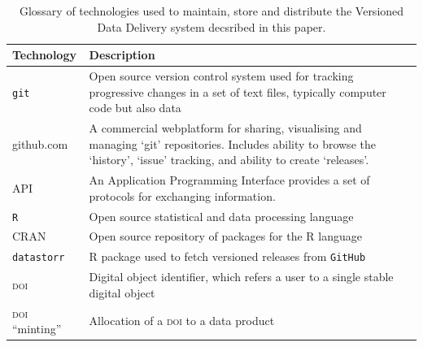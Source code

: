 \documentclass[a4paper,11pt]{article}
\begin{document}
\begin{table}[h!]
\centering
\caption{Glossary of technologies used to maintain, store and distribute the Versioned Data Delivery system decsribed in this paper.}
{\footnotesize
\vspace{1cm}
  \begin{tabular}{p{5cm}p{10cm}}
  \hline
  \textbf{Technology} & \textbf{Description} \\\hline
   \texttt{git} & Open source version control system used for tracking progressive changes in a set of text files, typically computer code but also data\\
   github.com & A commercial webplatform for sharing, visualising and managing `git' repositories. Includes ability to browse the `history', `issue' tracking, and ability to create `releases'.\\
  \textsc{API}   & An Application Programming Interface provides a set of protocols for exchanging information.\\
   \texttt{R}     &  Open source statistical and data processing language \\
   \textsc{CRAN}  &  Open source repository of packages for the R language \\
   \texttt{datastorr} & R package used to fetch versioned releases from \texttt{GitHub}  \\
   \textsc{doi} & Digital object identifier, which refers a user to a single stable digital object \\
   \textsc{doi} ``minting'' & Allocation of a \textsc{doi} to a data product\\
   \hline
  \end{tabular}
  }
\label{tab:technologies}
\end{table}

\newpage
\end{document}
